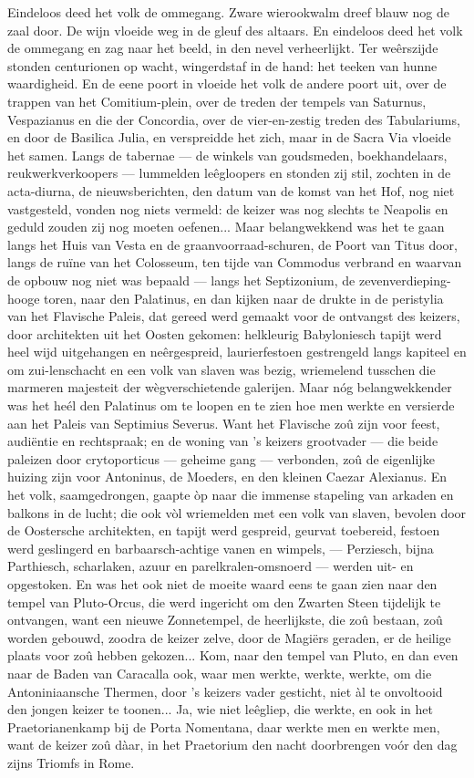 \documentclass[a4paper, 12pt, oneside, dutch]{article}
\begin{document}
Eindeloos deed het volk de ommegang. Zware wierookwalm dreef blauw nog de zaal door. De wijn vloeide weg in de gleuf des altaars. En eindeloos deed het volk de ommegang en zag naar het beeld, in den nevel verheerlijkt. Ter weêrszijde stonden centurionen op wacht, wingerdstaf in de hand: het teeken van hunne waardigheid. En de eene poort in vloeide het volk de andere poort uit, over de trappen van het Comitium-plein, over de treden der tempels van Saturnus, Vespazianus en die der Concordia, over de vier-en-zestig treden des Tabulariums, en door de Basilica Julia, en verspreidde het zich, maar in de Sacra Via vloeide het samen. Langs de tabernae --- de winkels van goudsmeden, boekhandelaars, reukwerkverkoopers --- lummelden leêgloopers en stonden zij stil, zochten in de acta-diurna, de nieuwsberichten, den datum van de komst van het Hof, nog niet vastgesteld, vonden nog niets vermeld: de keizer was nog slechts te Neapolis en geduld zouden zij nog moeten oefenen... Maar belangwekkend was het te gaan langs het Huis van Vesta en de graanvoorraad-schuren, de Poort van Titus door, langs de ruïne van het Colosseum, ten tijde van Commodus verbrand en waarvan de opbouw nog niet was bepaald --- langs het Septizonium, de zevenverdieping-hooge toren, naar den Palatinus, en dan kijken naar de drukte in de peristylia van het Flavische Paleis, dat gereed werd gemaakt voor de ontvangst des keizers, door architekten uit het Oosten gekomen: helkleurig Babyloniesch tapijt werd heel wijd uitgehangen en neêrgespreid, laurierfestoen gestrengeld langs kapiteel en om zui-lenschacht en een volk van slaven was bezig, wriemelend tusschen die marmeren majesteit der wègverschietende galerijen. Maar nóg belangwekkender was het heél den Palatinus om te loopen en te zien hoe men werkte en versierde aan het Paleis van Septimius Severus. Want het Flavische zoû zijn voor feest, audiëntie en rechtspraak; en de woning van 's keizers grootvader --- die beide paleizen door crytoporticus --- geheime gang --- verbonden, zoû de eigenlijke huizing zijn voor Antoninus, de Moeders, en den kleinen Caezar Alexianus. En het volk, saamgedrongen, gaapte òp naar die immense stapeling van arkaden en balkons in de lucht; die ook vòl wriemelden met een volk van slaven, bevolen door de Oostersche architekten, en tapijt werd gespreid, geurvat toebereid, festoen werd geslingerd en barbaarsch-achtige vanen en wimpels, --- Perziesch, bijna Parthiesch, scharlaken, azuur en parelkralen-omsnoerd --- werden uit- en opgestoken. En was het ook niet de moeite waard eens te gaan zien naar den tempel van Pluto-Orcus, die werd ingericht om den Zwarten Steen tijdelijk te ontvangen, want een nieuwe Zonnetempel, de heerlijkste, die zoû bestaan, zoû worden gebouwd, zoodra de keizer zelve, door de Magiërs geraden, er de heilige plaats voor zoû hebben gekozen... Kom, naar den tempel van Pluto, en dan even naar de Baden van Caracalla ook, waar men werkte, werkte, werkte, om die Antoniniaansche Thermen, door 's keizers vader gesticht, niet àl te onvoltooid den jongen keizer te toonen... Ja, wie niet leêgliep, die werkte, en ook in het Praetorianenkamp bij de Porta Nomentana, daar werkte men en werkte men, want de keizer zoû dàar, in het Praetorium den nacht doorbrengen voór den dag zijns Triomfs in Rome.
\end{document}
